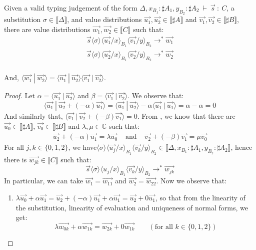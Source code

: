 \documentclass[runningheads,orivec,envcountsame,envcountsect]{llncs}
\newcommand\lra{\longrightarrow}
\newcommand\ansubst[2]{\ensuremath{\langle #1 \rangle_{#2}}}
\def\C{\mathbb{C}}            %
\def\scal#1#2{\langle{#1}~|~{#2}\rangle}
\def\eval{\lra^*}
\def\sem#1{\llbracket#1\rrbracket}
\def\TYP#1#2#3{#1~{\vdash}~#2~{:}~#3}
\begin{document}
\begin{lemma}\label{lem:UnitPreserTens} %
Given a valid typing judgement of the form $\TYP{\Delta,x_{B_1}:\sharp A_1, y_{B_2}:\sharp A_2}{\vec{s}}{C}$, a substitution $\sigma\in\sem{\Delta}$, and value distributions $\vec{u_1},\vec{u_2}\in\sem{\sharp A}$ and $\vec{v_1},\vec{v_2}\in\sem{\sharp B}$, there are value distributions $\vec{w_1},\vec{w_2}\in\sem{C}$ such that:
\[
\begin{array}{c}
    \vec{s}\ansubst{\sigma}{}\ansubst{\vec{u_1}/x}{B_1}{\ansubst{\vec{v_1}/y}{B_2}}\eval\vec{w_1}\\
    \vec{s}\ansubst{\sigma}{}\ansubst{\vec{u_2}/x}{B_1}{\ansubst{\vec{v_2}/y}{B_2}}\eval\vec{w_2}\\
\end{array}
\]

And, $\scal{\vec{w_1}}{\vec{w_2}} = \scal{\vec{u_1}}{\vec{u_2}} \scal{\vec{v_1}}{\vec{v_2}}$.

\begin{proof}
    Let $\alpha=\scal{\vec{u_1}}{\vec{u_2}}$ and $\beta=\scal{\vec{v_1}}{\vec{v_2}}$. We observe that:
    \[
    \scal{\vec{u_1}}{\vec{u_2}+(-\alpha)\vec{u_1}} = \scal{\vec{u_1}}{\vec{u_2}} - \alpha \scal{\vec{u_1}}{\vec{u_1}} = \alpha - \alpha = 0
    \]
    And similarly that, $\scal{\vec{v_1}}{\vec{v_2}+ (-\beta) \vec{v_1}} = 0$. From , we know that there are $\vec{u_0}\in\sem{\sharp A}$, $\vec{v_0}\in\sem{\sharp B}$ and $\lambda,\mu\in\C$ such that:
    \begin{align*}
        \vec{u_2} +(-\alpha)\vec{u_1} = \lambda\vec{u_0}& \text{ and } & \vec{v_2} + (-\beta)\vec{v_1} = \mu\vec{v_0} 
    \end{align*}
    For all $j,k\in\{0,1,2\}$, we have$\ansubst{\sigma}{}\ansubst{\vec{u_j}/x}{B_1}\ansubst{\vec{v_k}/y}{B_2}\in\sem{\Delta,x_{B_1}:\sharp A_1, y_{B_2}:\sharp A_2}$, hence there is $\vec{w_{jk}}\in\sem{C}$ such that:
    \[
    \vec{s}\ansubst{\sigma}{}\ansubst{u_j/x}{B_1}\ansubst{\vec{v_k}/y}{B_2}\eval\vec{w_{jk}}
    \]
    In particular, we can take $\vec{w_1}=\vec{w_{11}}$ and $\vec{w_2}=\vec{w_{22}}$. Now we observe that:
    \begin{enumerate}
        \item\label{A9:it1} $\lambda \vec{u_0} + \alpha\vec{u_1}=\vec{u_2} + (-\alpha) \vec{u_1} + \alpha \vec{u_1} = \vec{u_2} + 0 \vec{u_1}$, so that from the linearity of the substitution, linearity of evaluation and uniqueness of normal forms, we get:
        \[
        \lambda\vec{w_{0k}} + \alpha \vec{w_{1k}} = \vec{w_{2k}} + 0 \vec{w_{1k}} \qquad(\text{for all }k\in\{0,1,2\})
        \]
        

\end{enumerate}
\end{proof}
\end{lemma}
\end{document}
